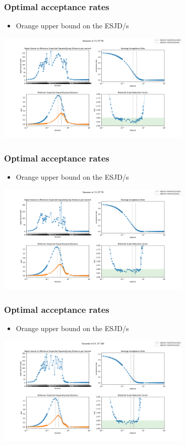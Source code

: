 \begin{frame}[t]
    \frametitle{Optimal acceptance rates}
    \begin{itemize}
    \item {\color{orange} Orange } upper bound on the ESJD/s
    \end{itemize}
    \centering
    \includegraphics[width=0.7\textwidth]{imgs/bound-5-dim-50-Gaussian-results.png}
\end{frame}

\begin{frame}[t]
    \frametitle{Optimal acceptance rates}
    \begin{itemize}
    \item {\color{orange} Orange } upper bound on the ESJD/s
    \end{itemize}
    \centering
    \includegraphics[width=0.7\textwidth]{imgs/bound-5-dim-70-Gaussian-results.png}
\end{frame}

\begin{frame}[t]
    \frametitle{Optimal acceptance rates}
    \begin{itemize}
    \item {\color{orange} Orange } upper bound on the ESJD/s
    \end{itemize}
    \centering
    \includegraphics[width=0.7\textwidth]{imgs/bound-5-dim-100-Gaussian-results.png}
\end{frame}

